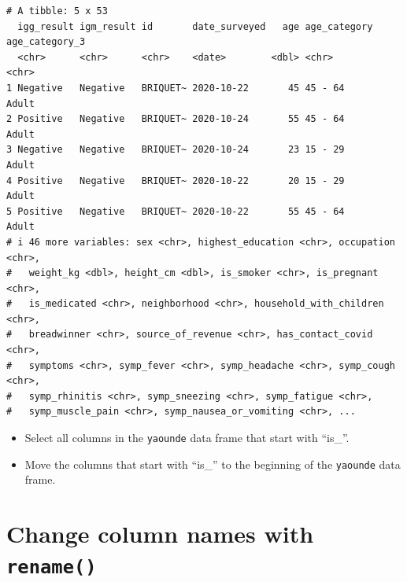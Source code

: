 \documentclass[
  letterpaper,
  DIV=11,
  numbers=noendperiod]{scrreprt}
\providecommand{\tightlist}{%
  \setlength{\itemsep}{0pt}\setlength{\parskip}{0pt}}\usepackage{longtable,booktabs,array}
\begin{document}
\begin{verbatim}
# A tibble: 5 x 53
  igg_result igm_result id       date_surveyed   age age_category age_category_3
  <chr>      <chr>      <chr>    <date>        <dbl> <chr>        <chr>         
1 Negative   Negative   BRIQUET~ 2020-10-22       45 45 - 64      Adult         
2 Positive   Negative   BRIQUET~ 2020-10-24       55 45 - 64      Adult         
3 Negative   Negative   BRIQUET~ 2020-10-24       23 15 - 29      Adult         
4 Positive   Negative   BRIQUET~ 2020-10-22       20 15 - 29      Adult         
5 Positive   Negative   BRIQUET~ 2020-10-22       55 45 - 64      Adult         
# i 46 more variables: sex <chr>, highest_education <chr>, occupation <chr>,
#   weight_kg <dbl>, height_cm <dbl>, is_smoker <chr>, is_pregnant <chr>,
#   is_medicated <chr>, neighborhood <chr>, household_with_children <chr>,
#   breadwinner <chr>, source_of_revenue <chr>, has_contact_covid <chr>,
#   symptoms <chr>, symp_fever <chr>, symp_headache <chr>, symp_cough <chr>,
#   symp_rhinitis <chr>, symp_sneezing <chr>, symp_fatigue <chr>,
#   symp_muscle_pain <chr>, symp_nausea_or_vomiting <chr>, ...
\end{verbatim}

\begin{tcolorbox}[enhanced jigsaw, titlerule=0mm, colback=white, left=2mm, breakable, opacitybacktitle=0.6, colbacktitle=quarto-callout-tip-color!10!white, colframe=quarto-callout-tip-color-frame, bottomtitle=1mm, opacityback=0, coltitle=black, arc=.35mm, toptitle=1mm, title=\textcolor{quarto-callout-tip-color}{\faLightbulb}\hspace{0.5em}{Practice}, leftrule=.75mm, toprule=.15mm, bottomrule=.15mm, rightrule=.15mm]

\begin{itemize}
\tightlist
\item
  Select all columns in the \texttt{yaounde} data frame that start with
  ``is\_''.
\end{itemize}

\begin{itemize}
\tightlist
\item
  Move the columns that start with ``is\_'' to the beginning of the
  \texttt{yaounde} data frame.
\end{itemize}

\end{tcolorbox}

\section{\texorpdfstring{Change column names with
\texttt{rename()}}{Change column names with rename()}}\label{change-column-names-with-rename}
\end{document}
